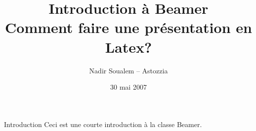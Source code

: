 \documentclass{beamer}
\title[Faire une pr{\'e}sentation en Latex avec Beamer]{Introduction {\`a} Beamer\\Comment faire une pr{\'e}sentation en Latex?}
\author{Nadir Soualem -- Astozzia}
\institute{Math-linux.com}
\date{30 mai 2007}
\begin{document}
\begin{frame}
\titlepage
\end{frame}


\begin{frame}{Introduction}
Ceci est une courte introduction {\`a} la classe Beamer.
\end{frame}
\end{document}
